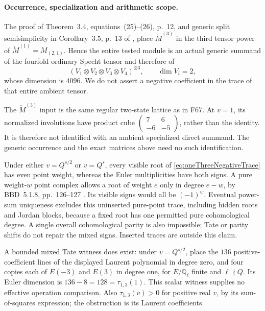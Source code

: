 \documentclass[11pt,a4paper]{article}
\newcommand{\Q}{\mathbb Q}\newcommand{\Z}{\mathbb Z}\newcommand{\C}{\mathbb C}\newcommand{\N}{\mathbb N}\newcommand{\F}{\mathbb F}
\newcommand{\fid}[1]{\textsf{#1}}\newcommand{\gate}[1]{\textsf{#1}}
\theoremstyle{named}\newtheorem{finding}{Finding}[section]
\theoremstyle{definition}\newtheorem{definition}[finding]{Definition}
\theoremstyle{remark}\newtheorem{remark}[finding]{Remark}
\begin{document}
\paragraph{Occurrence, specialization and arithmetic scope.}
The proof of Theorem~3.4, equations~(25)--(26),
p.~12, and generic split semisimplicity in
Corollary~3.5, p.~13 of
\cite{BlasiakChebyshev}, place
\(\check M^{(3)}\) in the third tensor power
of \(\check M^{(1)}=M_{(2,1)}\).
Hence the entire tested module is an actual
generic summand of the fourfold ordinary
Specht tensor and therefore of
\[
 (V_1\otimes V_2\otimes V_3\otimes V_4)^{\otimes3},
 \qquad\dim V_i=2,
\]
whose dimension is \(4096\).
We do not assert a negative coefficient in
the trace of that entire ambient tensor.

The \(\check M^{(3)}\) input is the same regular
two-state lattice as in \fid{F67}.
At \(v=1\), its normalized involutions have
product cube
\(\left(\begin{smallmatrix}7&6\\-6&-5\end{smallmatrix}\right)\),
rather than the identity.
It is therefore not identified with an
ambient specialized direct summand.
The generic occurrence and the exact
matrices above need no such identification.

Under either \(v=Q^{s/2}\) or \(v=Q^s\),
every visible root of
\eqref{eq:oneThreeNegativeTrace} has even
point weight, whereas the Euler multiplicities
have both signs. A pure weight-\(w\) point
complex allows a root of weight \(e\) only
in degree \(e-w\), by BBD~5.1.8,
pp.~126--127 \cite{BBD}.
Its visible signs would all be \((-1)^w\).
Eventual power-sum uniqueness excludes this
uninserted pure-point trace, including hidden
roots and Jordan blocks, because a fixed root
has one permitted pure cohomological degree.
A single overall cohomological parity is also
impossible; Tate or parity shifts do not repair
the mixed signs. Inserted traces are outside
this claim.

A bounded mixed Tate witness does exist:
under \(v=Q^{s/2}\), place the \(136\)
positive-coefficient lines of the displayed
Laurent polynomial in degree zero, and four
copies each of \(E(-3)\) and \(E(3)\) in
degree one, for \(E/\Q_\ell\) finite and
\(\ell\nmid Q\).
Its Euler dimension is \(136-8=128=\tau_{1,3}(1)\).
This scalar witness supplies no effective
operation comparison.
Also \(\tau_{1,3}(v)>0\) for positive real
\(v\), by its sum-of-squares expression;
the obstruction is its Laurent coefficients.
\end{document}
